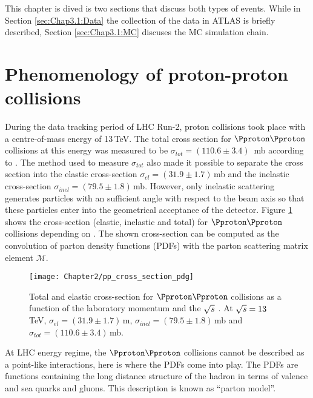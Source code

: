  This chapter is dived is two sections that discuss both types of 
 events. While in Section \ref{sec:Chap3.1:Data} the collection of the 
 data in ATLAS is briefly described, Section \ref{sec:Chap3.1:MC}
discuses the MC simulation chain. 





\section{Phenomenology of proton-proton collisions}
\label{sec:Chap2:PhenoOfPP}
During the data tracking period of LHC Run-2, proton collisions took place with a centre-of-mass energy of 13$\,$TeV. 
The total cross section for $\Pproton\Pproton$ collisions at this energy was measured to be $\sigma_{tot} = (110.6 \pm 3.4)\,$
mb according to \cite{Cafagna:2021sge}. The method used to measure $\sigma_{tot}$ also made it 
possible to separate the cross section into the elastic cross-section $\sigma_{el} = (31.9 \pm 1.7)\,$mb and 
the inelastic cross-section $\sigma_{inel} = (79.5 \pm 1.8)\,$mb.
However, only inelastic scattering generates particles with an sufficient angle with respect to the beam 
axis so that these particles enter into the geometrical acceptance of the detector. 
Figure \ref{fig:Chap2:pp_cross_section_pdg} shows the cross-section (elastic, inelastic and total) for $\Pproton \Pproton$ collisions depending on \CM.
 The shown cross-section can be computed as the convolution of parton density functions (PDFs) with the parton scattering matrix element $\mathcal{M}$. 

\begin{figure}
 	 \centering
 	  \texttt{[image: Chapter2/pp\_cross\_section\_pdg]}
	  \caption{Total and elastic cross-section for $\Pproton \Pproton$ collisions as a 
	  		function of the laboratory momentum and the $\sqrt{s}$ \cite{pdgXsecProton}.
			At $\sqrt{s}=13\,$TeV,  $\sigma_{el} = (31.9 \pm 1.7)\,$m, $\sigma_{inel} = (79.5 \pm 1.8)\,$mb and 
			$\sigma_{tot} = (110.6 \pm 3.4)\,$mb.} 
	\label{fig:Chap2:pp_cross_section_pdg}%
\end{figure}


At LHC energy regime,
the $\Pproton \Pproton$ collisions cannot be
described as a point-like interactions, here is where the PDFs come into play.
The PDFs are functions containing the long distance structure of the hadron in terms of valence and sea quarks and gluons. 
This description is known as ``parton model''.


